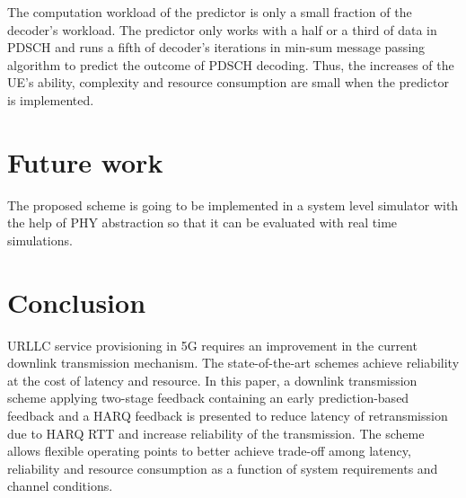 \documentclass[conference]{IEEEtran}
\begin{document}
The computation workload of the predictor is only a small fraction of the decoder's workload. The predictor only works with a half or a third of data in PDSCH and runs a fifth of decoder's iterations in min-sum message passing algorithm to predict the outcome of PDSCH decoding. Thus, the increases of the UE's ability, complexity and resource consumption are small when the predictor is implemented.

\section{Future work}

The proposed scheme is going to be implemented in a system level simulator with the help of PHY abstraction so that it can be evaluated with real time simulations.

\section{Conclusion}

URLLC service provisioning in 5G requires an improvement in the current downlink transmission mechanism. The state-of-the-art schemes achieve reliability at the cost of latency and resource. In this paper, a downlink transmission scheme applying two-stage feedback containing an early prediction-based feedback and a HARQ feedback is presented to reduce latency of retransmission due to HARQ RTT and increase reliability of the transmission. The scheme allows flexible operating points to better achieve trade-off among latency, reliability and resource consumption as a function of system requirements and channel conditions.
\end{document}

